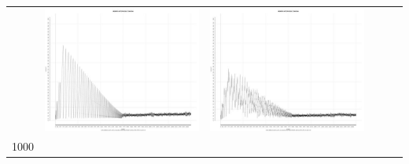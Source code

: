 \begin{table}[htbp]
{\begin{tabular}{l | ccccc}
    			   & \begin{minipage}{.15\textwidth}\vspace{2pt}     							
     			 	\includegraphics[width=\linewidth]{images/mema-triple/N7}
    				 \end{minipage}
    			   &	 \begin{minipage}{.15\textwidth}\vspace{2pt}     							
     			 	\includegraphics[width=\linewidth]{images/mema-triple/N10}
    				 \end{minipage}\\	
		1000   &	 \begin{minipage}{.15\textwidth}\vspace{2pt}     							

\end{minipage}
\end{tabular}}
\end{table}
